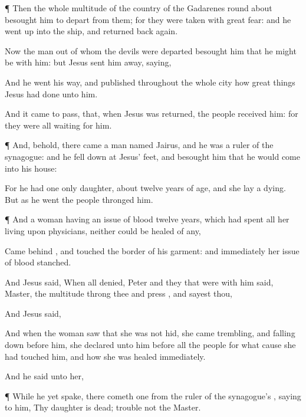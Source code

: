 {\par }{\PP {}¶
Then the
whole
multitude of the
country of the
Gadarenes round
about
besought
him to
depart
from
them;
for they were taken
with
great
fear:
and
he went
up
into the
ship, and returned back
again.

Now the
man out
of
whom the
devils
were
departed
besought
him that he might be
with
him:
but
Jesus
sent
him
away,
saying,

And he went his
way, and
published
throughout the
whole
city how great
things
Jesus had
done unto
him.

And it came to pass,
that,
when
Jesus was
returned, the
people
{}
received
him:
for they
were
all
waiting for
him.


\par }{\PP {}¶
And,
behold, there
came a
man
named
Jairus,
and
he
was a
ruler of the
synagogue:
and he fell
down
at
Jesus’
feet, and
besought
him that he would
come
into
his
house:

For
he
had one
only
daughter,
about
twelve years of
age,
and
she lay a
dying.
But
as
he
went the
people
thronged
him.


\par }{\PP {}¶
And a
woman
having an
issue of
blood
twelve
years,
which had
spent
all her
living
upon
physicians,
neither
could be
healed
of
any,

Came
behind
{}, and
touched the
border of
his
garment:
and
immediately
her
issue of
blood
stanched.

And
Jesus
said,
{}
When
all
denied,
Peter
and they that were
with
him
said,
Master, the
multitude
throng
thee
and
press
{},
and sayest
thou,
{}

And
Jesus
said,
{}

And
when the
woman
saw
that she
was
not
hid, she
came
trembling,
and falling down
before
him, she
declared unto
him
before
all the
people
for
what
cause she had
touched
him,
and
how she was
healed
immediately.

And he
said unto
her,
{}


\par }{\PP {}¶
While
he
yet
spake, there
cometh
one
from the ruler of the
synagogue’s
{},
saying to
him,
Thy
daughter is
dead;
trouble
not the
Master.

}
